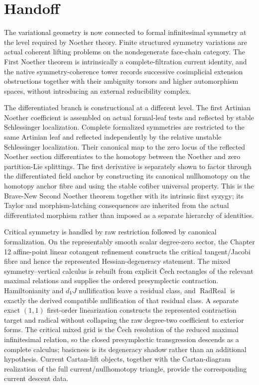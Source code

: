 \section{Handoff}
\label{sec:symmetry-noether-handoff}

The variational geometry is now connected to formal infinitesimal symmetry at the
level required by Noether theory.  Finite structured symmetry variations are actual
coherent lifting problems on the nondegenerate face-chain category.  The First
Noether theorem is intrinsically a complete-filtration current identity, and the
native symmetry-coherence tower records successive cosimplicial extension
obstructions together with their ambiguity torsors and higher automorphism spaces,
without introducing an external reducibility complex.

The differentiated branch is constructional at a different level.  The first
Artinian Noether coefficient is assembled on actual formal-leaf tests and reflected
by stable Schlessinger localization.  Complete formalized symmetries are restricted
to the same Artinian leaf and reflected independently by the relative unstable
Schlessinger localization.  Their canonical map to the zero locus of the reflected
Noether section differentiates to the homotopy between the Noether and zero
partition-Lie splittings.  The first derivative is separately shown to factor
through the differentiated field anchor by constructing its canonical nullhomotopy
on the homotopy anchor fibre and using the stable cofiber universal property.  This
is the Brave-New Second Noether theorem together with its intrinsic first syzygy;
its Taylor and morphism-latching consequences are inherited from the actual
differentiated morphism rather than imposed as a separate hierarchy of identities.

Critical symmetry is handled by raw restriction followed by canonical
formalization.  On the representably smooth scalar degree-zero sector, the Chapter
12 affine-point linear cotangent refinement constructs the critical tangent/Jacobi
fibre and hence the represented Hessian-degeneracy statement.  The mixed
symmetry--vertical calculus is rebuilt from explicit \v{C}ech rectangles of the
relevant maximal relations and supplies the ordered presymplectic contraction.
Hamiltonianity and $d_VJ$ nullification leave a residual class, and
$\operatorname{RadReal}$ is exactly the derived compatible nullification of that
residual class.  A separate exact $(1,1)$ first-order linearization constructs the
represented contraction target and radical without collapsing the raw degree-two
coefficient to exterior forms.  The critical mixed grid is the \v{C}ech resolution of the reduced maximal
infinitesimal relation, so the closed presymplectic transgression descends as a
complete calculus; basicness is its degeneracy shadow rather than an additional
hypothesis.  Current Cartan-lift objects, together with the Cartan-diagram
realization of the full current/nullhomotopy triangle, provide the corresponding
current descent data.

